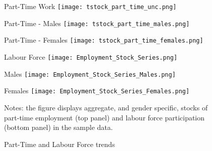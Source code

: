 \documentclass[12pt, a4paper]{article}
\begin{document}

\begin{figure}[!htbp]
\begin{minipage}[b]{0.32\textwidth}{Part-Time Work}
	\centering
	\texttt{[image: tstock\_part\_time\_unc.png]}
\end{minipage}
\begin{minipage}[b]{0.32\textwidth}{Part-Time - Males}
\centering
\texttt{[image: tstock\_part\_time\_males.png]}
\end{minipage}
\begin{minipage}[b]{0.32\textwidth}{Part-Time - Females}
\centering
\texttt{[image: tstock\_part\_time\_females.png]}
\end{minipage}
\begin{minipage}[b]{0.32\textwidth}{Labour Force}
\centering
\texttt{[image: Employment\_Stock\_Series.png]}
\end{minipage}
\begin{minipage}[b]{0.32\textwidth}{Males}
\centering
\texttt{[image: Employment\_Stock\_Series\_Males.png]}
\end{minipage}
\begin{minipage}[b]{0.32\textwidth}{Females}
\centering
\texttt{[image: Employment\_Stock\_Series\_Females.png]}
\end{minipage}
\footnotesize{
	\justifying Notes: the figure displays aggregate, and gender specific, stocks of part-time employment (top panel) and labour force participation (bottom panel) in the sample data.\par}
\captionsetup{font=small,justification=raggedright}
\caption{Part-Time and Labour Force trends}\label{fig:parttime_trend}
\end{figure}
\end{document}
